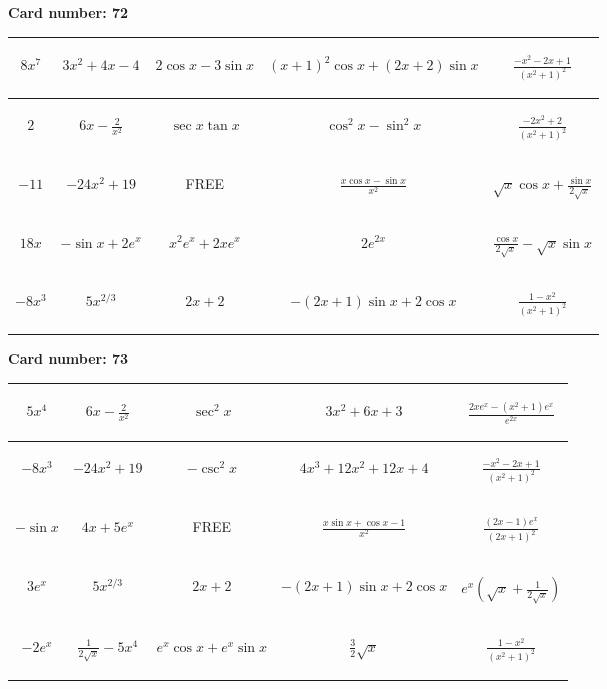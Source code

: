 \documentclass{article}
\newcommand{\entry}[1]{\begin{minipage}[t][2.75cm][t]{4cm} \vspace{1cm} \begin{center}#1\end{center} \end{minipage}}
\newcommand{\freespace}{\entry{FREE}}
\newcommand{\cardnumber}[1]{\noindent \textbf{Card number: #1} \bigskip}
\begin{document}
\pagebreak

\cardnumber{72}
\begin{center}
\begin{tabular}{|*{5}{c|}}
    \hline
    \entry{$8x^7$} & \entry{$3x^2 + 4x - 4$} & \entry{$2 \cos x - 3 \sin x$} & \entry{$(x + 1)^2 \cos x + (2x + 2) \sin x$} & \entry{$\frac{-x^2 - 2x + 1}{(x^2 + 1)^2}$} \\ \hline
    \entry{$2$} & \entry{$6x - \frac{2}{x^2}$} & \entry{$\sec x \tan x$} & \entry{$\cos^2 x - \sin^2 x$} & \entry{$\frac{-2x^2 + 2}{(x^2 + 1)^2}$} \\ \hline
    \entry{$-11$} & \entry{$-24x^2 + 19$} & \freespace & \entry{$\frac{x \cos x - \sin x}{x^2}$} & \entry{$\sqrt{x} \cos x + \frac{\sin x}{2 \sqrt{x}}$} \\ \hline
    \entry{$18x$} & \entry{$-\sin x + 2e^x$} & \entry{$x^2 e^x + 2x e^x$} & \entry{$2e^{2x}$} & \entry{$\frac{\cos x}{2 \sqrt{x}} - \sqrt{x} \sin x$} \\ \hline
    \entry{$-8x^3$} & \entry{$5x^{2/3}$} & \entry{$2x + 2$} & \entry{$-(2x + 1) \sin x + 2 \cos x$} & \entry{$\frac{1 - x^2}{(x^2 + 1)^2}$} \\ \hline
\end{tabular}
\end{center}

\pagebreak

\cardnumber{73}
\begin{center}
\begin{tabular}{|*{5}{c|}}
    \hline
    \entry{$5x^4$} & \entry{$6x - \frac{2}{x^2}$} & \entry{$\sec^2 x$} & \entry{$3x^2 + 6x + 3$} & \entry{$\frac{2x e^x - (x^2 + 1) e^x}{e^{2x}}$} \\ \hline
    \entry{$-8x^3$} & \entry{$-24x^2 + 19$} & \entry{$-\csc^2 x$} & \entry{$4x^3 + 12x^2 + 12x + 4$} & \entry{$\frac{-x^2 - 2x + 1}{(x^2 + 1)^2}$} \\ \hline
    \entry{$-\sin x$} & \entry{$4x + 5e^x$} & \freespace & \entry{$\frac{x \sin x + \cos x - 1}{x^2}$} & \entry{$\frac{(2x - 1) e^x}{(2x + 1)^2}$} \\ \hline
    \entry{$3e^x$} & \entry{$5x^{2/3}$} & \entry{$2x + 2$} & \entry{$-(2x + 1) \sin x + 2 \cos x$} & \entry{$e^x \left(\sqrt{x} + \frac{1}{2\sqrt{x}}\right)$} \\ \hline
    \entry{$-2e^x$} & \entry{$\frac{1}{2\sqrt{x}} - 5x^4$} & \entry{$e^x \cos x + e^x \sin x$} & \entry{$\frac{3}{2} \sqrt{x}$} & \entry{$\frac{1 - x^2}{(x^2 + 1)^2}$} \\ \hline
\end{tabular}
\end{center}
\end{document}
